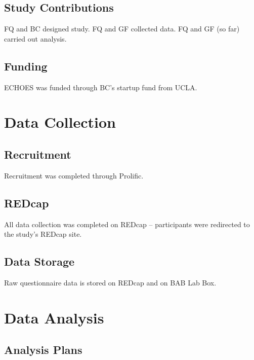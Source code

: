 \documentclass[
]{book}
\begin{document}
\hypertarget{study-contributions}{%
\section{Study Contributions}\label{study-contributions}}

FQ and BC designed study. FQ and GF collected data. FQ and GF (so far) carried out analysis.

\hypertarget{funding}{%
\section{Funding}\label{funding}}

ECHOES was funded through BC's startup fund from UCLA.

\hypertarget{data-collection}{%
\chapter{Data Collection}\label{data-collection}}

\hypertarget{recruitment}{%
\section{Recruitment}\label{recruitment}}

Recruitment was completed through Prolific.

\hypertarget{redcap}{%
\section{REDcap}\label{redcap}}

All data collection was completed on REDcap -- participants were redirected to the study's REDcap site.

\hypertarget{data-storage}{%
\section{Data Storage}\label{data-storage}}

Raw questionnaire data is stored on REDcap and on BAB Lab Box.

\hypertarget{data-analysis}{%
\chapter{Data Analysis}\label{data-analysis}}

\hypertarget{analysis-plans}{%
\section{Analysis Plans}\label{analysis-plans}}
\end{document}
